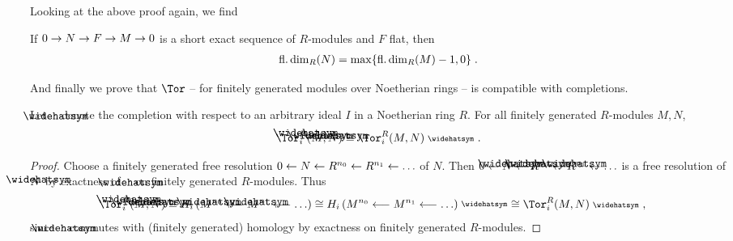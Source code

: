 \documentclass[a4paper,parskip=half,numbers=enddot, DIV=12]{scrreprt}
\begin{document}
Looking at the above proof again, we find
\begin{fact}
	If $0\morphism N\morphism F\morphism M\morphism 0$ is a short exact sequence of $R$-modules and $F$ flat, then 
	\begin{align*}
		\operatorname{fl.dim}_R(N)=\max\{\operatorname{fl.dim}_R(M)-1,0\}\;.
	\end{align*}
\end{fact}
And finally we prove that $\Tor$ -- for finitely generated modules over Noetherian rings -- is compatible with completions.
\begin{prop}
	Let $\roof{\phantom{x}}$ denote the completion with respect to an arbitrary ideal $I$ in a Noetherian ring $R$. For all finitely generated $R$-modules $M,N$,
	\begin{align*}
		\Tor_i^{\roof{R}}(\roof{M},\roof{N})\cong \Tor_i^R(M,N)^\complete \;.
	\end{align*}
\end{prop}
\begin{proof}
	Choose a finitely generated free resolution $0\lmorphism N\lmorphism R^{n_0}\lmorphism R^{n_1}\lmorphism\ldots$ of $N$. Then $0\lmorphism \roof{N}\lmorphism \roof{R}^{n_0}\lmorphism \roof{R}^{n_1}\lmorphism\ldots$ is a free resolution of $\roof{N}$ by exactness of $\roof{\phantom{x}}$ on finitely generated $R$-modules. Thus
	\begin{align*}
		\Tor_i^{\roof{R}}(\roof{M},\roof{N})&\cong H_i\left(\roof{M}^{n_0}\lmorphism \roof{M}^{n_1}\lmorphism\ldots\right)\cong  H_i\left(M^{n_0}\lmorphism M^{n_1}\lmorphism\ldots\right)^\complete \cong \Tor_i^R(M,N)^\complete \;,
	\end{align*}
	since $\roof{\phantom{x}}$ commutes with (finitely generated) homology by exactness on finitely generated $R$-modules.
\end{proof}
\end{document}
